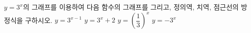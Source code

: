 $y=3^x$의 그래프를 이용하여 다음 함수의 그래프를 그리고, 정의역, 치역, 점근선의 방정식을 구하시오.
 $y=3^{x-1}$
 $y=3^x+2$
 $y=\left(\dfrac{1}{3}\right)^{x}$
 $y=-3^x$
